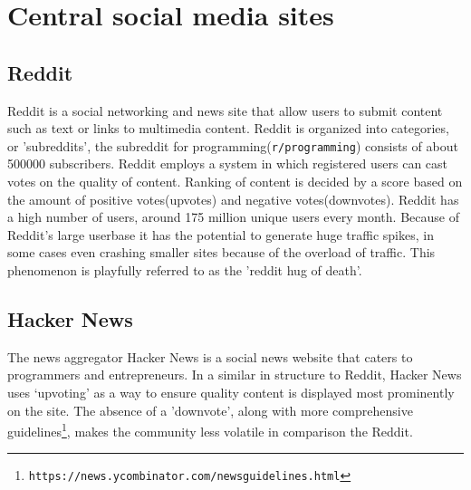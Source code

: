 \documentclass[a4paper,11pt]{article} %
\begin{document}
\section{Central social media sites}

\subsection{Reddit}

Reddit is a social networking and news site that allow users to submit content
such as text or links to multimedia content. Reddit is organized into categories, or 'subreddits', 
the subreddit for programming(\texttt{r/programming}) consists of about \num{500000}
subscribers.
Reddit employs a system in which registered users can cast votes on the
quality of content. Ranking of content is decided by a score based on the amount of positive
votes(upvotes) and negative votes(downvotes). Reddit has a high number of users, around 175 million
unique users every month. Because of Reddit's large userbase it has 
the potential to generate huge traffic spikes, in some cases even crashing
smaller sites because of the overload of traffic. This phenomenon is playfully referred to as 
the 'reddit hug of death’.


\subsection{Hacker News}
The news aggregator Hacker News is a social news website that caters to
programmers and entrepreneurs. In a similar in structure to Reddit, Hacker
News uses ‘upvoting’ as a way to ensure quality content is displayed most
prominently on the site. The absence of a 'downvote', along with more
comprehensive guidelines\footnote{\texttt{https://news.ycombinator.com/newsguidelines.html}},
makes the community less volatile in comparison the Reddit.
\end{document}
